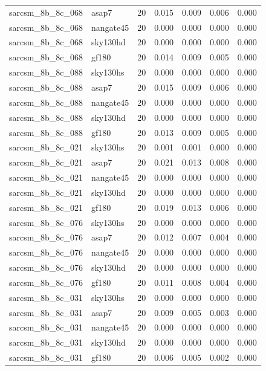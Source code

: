 \begin{tabular}{llrrrrr}
sarcsm\_8b\_8c\_068 & asap7 & 20 & 0.015 & 0.009 & 0.006 & 0.000 \\
sarcsm\_8b\_8c\_068 & nangate45 & 20 & 0.000 & 0.000 & 0.000 & 0.000 \\
sarcsm\_8b\_8c\_068 & sky130hd & 20 & 0.000 & 0.000 & 0.000 & 0.000 \\
sarcsm\_8b\_8c\_068 & gf180 & 20 & 0.014 & 0.009 & 0.005 & 0.000 \\
sarcsm\_8b\_8c\_088 & sky130hs & 20 & 0.000 & 0.000 & 0.000 & 0.000 \\
sarcsm\_8b\_8c\_088 & asap7 & 20 & 0.015 & 0.009 & 0.006 & 0.000 \\
sarcsm\_8b\_8c\_088 & nangate45 & 20 & 0.000 & 0.000 & 0.000 & 0.000 \\
sarcsm\_8b\_8c\_088 & sky130hd & 20 & 0.000 & 0.000 & 0.000 & 0.000 \\
sarcsm\_8b\_8c\_088 & gf180 & 20 & 0.013 & 0.009 & 0.005 & 0.000 \\
sarcsm\_8b\_8c\_021 & sky130hs & 20 & 0.001 & 0.001 & 0.000 & 0.000 \\
sarcsm\_8b\_8c\_021 & asap7 & 20 & 0.021 & 0.013 & 0.008 & 0.000 \\
sarcsm\_8b\_8c\_021 & nangate45 & 20 & 0.000 & 0.000 & 0.000 & 0.000 \\
sarcsm\_8b\_8c\_021 & sky130hd & 20 & 0.000 & 0.000 & 0.000 & 0.000 \\
sarcsm\_8b\_8c\_021 & gf180 & 20 & 0.019 & 0.013 & 0.006 & 0.000 \\
sarcsm\_8b\_8c\_076 & sky130hs & 20 & 0.000 & 0.000 & 0.000 & 0.000 \\
sarcsm\_8b\_8c\_076 & asap7 & 20 & 0.012 & 0.007 & 0.004 & 0.000 \\
sarcsm\_8b\_8c\_076 & nangate45 & 20 & 0.000 & 0.000 & 0.000 & 0.000 \\
sarcsm\_8b\_8c\_076 & sky130hd & 20 & 0.000 & 0.000 & 0.000 & 0.000 \\
sarcsm\_8b\_8c\_076 & gf180 & 20 & 0.011 & 0.008 & 0.004 & 0.000 \\
sarcsm\_8b\_8c\_031 & sky130hs & 20 & 0.000 & 0.000 & 0.000 & 0.000 \\
sarcsm\_8b\_8c\_031 & asap7 & 20 & 0.009 & 0.005 & 0.003 & 0.000 \\
sarcsm\_8b\_8c\_031 & nangate45 & 20 & 0.000 & 0.000 & 0.000 & 0.000 \\
sarcsm\_8b\_8c\_031 & sky130hd & 20 & 0.000 & 0.000 & 0.000 & 0.000 \\
sarcsm\_8b\_8c\_031 & gf180 & 20 & 0.006 & 0.005 & 0.002 & 0.000 \\

\end{tabular}
